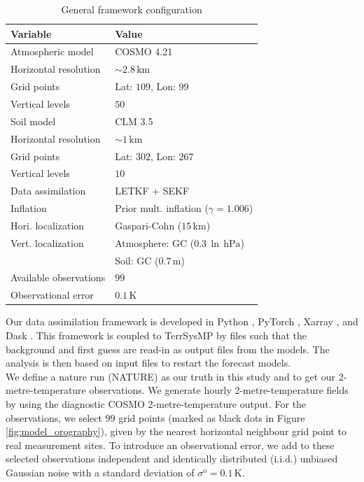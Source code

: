 \documentclass[HESSD, manuscript]{copernicus}
\begin{document}
\begin{table}[h]
	\caption{General framework configuration\label{tab:model_config}}
	\begin{tabular}{l|l}
		Variable & Value \\ 
		\hline 
		Atmospheric model & COSMO 4.21 \\
		Horizontal resolution & $\sim 2.8\,\text{km}$\\
		Grid points & Lat: $109$, Lon: $99$\\
		Vertical levels & $50$\\
		\hline
		Soil model & CLM 3.5\\
		Horizontal resolution & $\sim 1\,\text{km}$\\
		Grid points & Lat: $302$, Lon: $267$\\
		Vertical levels & $10$\\
		\hline
		Data assimilation & LETKF + SEKF\\
		Inflation & Prior mult. inflation ($\gamma = 1.006$)\\
		Hori. localization & Gaspari-Cohn ($15\,\text{km}$)\\
		Vert. localization & Atmosphere: GC ($0.3\,\ln\,\text{hPa}$)\\
		& Soil: GC ($0.7\,\text{m}$)\\
		Available observations & $99$\\
		Observational error & $0.1\,\text{K}$		
	\end{tabular}
\end{table}

Our data assimilation framework \citep{finn_py_bacy_2020, finn_torch-assimilate_2020} is developed in Python \citep{van_rossum_python_1995}, PyTorch \citep{paszke_pytorch_2019}, Xarray \citep{hoyer_xarray_2017}, and Dask \citep{dask_development_team_dask_2016,rocklin_dask_2015}.
This framework is coupled to TerrSysMP by files such that the background and first guess are read-in as output files from the models.
The analysis is then based on input files to restart the forecast models.\\

We define a nature run (NATURE) as our truth in this study and to get our 2-metre-temperature observations.
We generate hourly 2-metre-temperature fields by using the diagnostic COSMO 2-metre-temperature output. For the observations, we select $99$ grid points (marked as black dots in Figure \ref{fig:model_orography}), given by the nearest horizontal neighbour grid point to real measurement sites.
To introduce an observational error, we add to these selected observations independent and identically distributed (i.i.d.) unbiased Gaussian noise with a standard deviation of $\sigma^\text{o} = 0.1\,\text{K}$.
\end{document}
